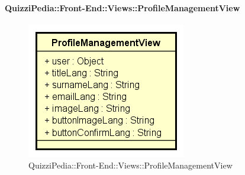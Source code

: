 \paragraph{QuizziPedia::Front-End::Views::ProfileManagementView}
\begin{figure} [ht]
	\centering
	\includegraphics[scale=0.45]{UML/Classi/Front-End/QuizziPedia_Front-end_Views_ProfileManagementView.png}
	\caption{QuizziPedia::Front-End::Views::ProfileManagementView}
\end{figure} \FloatBarrier
